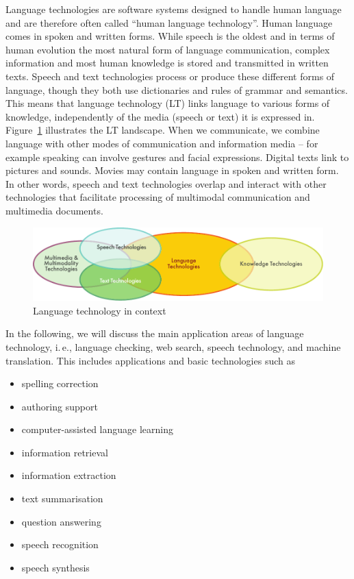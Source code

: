 \begin{multicols}{2}
  Language technologies are software systems designed to handle human language and are therefore often called ``human language technology''. Human language comes in spoken and written forms. While speech is the oldest and in terms of human evolution the most natural form of language communication, complex information and most human knowledge is stored and transmitted in written texts. Speech and text technologies process or produce these different forms of language, though they both use dictionaries and rules of grammar and semantics.  This means that language technology (LT) links language to various forms of knowledge, independently of the media (speech or text) it is expressed in. Figure~\ref{fig:ltincontext-eng} illustrates the LT landscape. When we communicate, we combine language with other modes of communication and information media – for example speaking can involve gestures and facial expressions. Digital texts link to pictures and sounds. Movies may contain language in spoken and written form. In other words, speech and text technologies overlap and interact with other technologies that facilitate processing of multimodal communication and multimedia documents.

\begin{figure}[htb]
  \center
  \includegraphics[width=\textwidth]{../_media/english/language_technologies}
  \caption{Language technology in context}
  \label{fig:ltincontext-eng}
\end{figure}

In the following, we will discuss the main application areas of language technology, i.\,e., language checking, web search, speech technology, and machine translation. This includes applications and basic technologies such as

\begin{itemize}
\item spelling correction
\item authoring support
\item computer-assisted language learning
\item information retrieval
\item information extraction
\item text summarisation
\item question answering
\item speech recognition
\item speech synthesis
\end{itemize}


\end{multicols}
